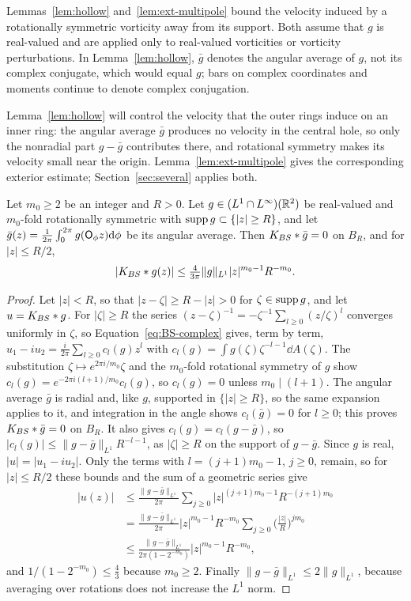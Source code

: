 Lemmas~\ref{lem:hollow} and~\ref{lem:ext-multipole} bound the velocity induced by a rotationally symmetric
vorticity away from its support. Both assume that $g$ is real-valued and are
applied only to real-valued vorticities or vorticity perturbations.
In Lemma~\ref{lem:hollow}, $\bar g$ denotes the angular average of $g$, not
its complex conjugate, which would equal $g$; bars on complex coordinates and
moments continue to denote complex conjugation.

Lemma~\ref{lem:hollow} will control the
velocity that the outer rings induce on an inner ring: the angular average
$\bar g$ produces no velocity in the central hole, so only the nonradial
part $g-\bar g$ contributes there, and rotational symmetry makes its
velocity small near the origin. Lemma~\ref{lem:ext-multipole} gives the
corresponding exterior estimate; Section~\ref{sec:several} applies both.

\begin{lemma}
\label{lem:hollow}
Let $m_0\ge2$ be an integer and $R>0$. Let $g\in (L^1\cap L^\infty)(\mathbb{R}^2)$ be
real-valued and $m_0$-fold rotationally symmetric with $\operatorname{supp} g\subset\{|z|\ge R\}$, and let
$\bar g(z)=\frac1{2\pi}\int_0^{2\pi}g(\mathsf{O}_\phi z)\dd\phi$ be its angular
average. Then $K_{BS}\ast\bar g=0$ on $B_R$, and for $|z|\le R/2$,
\[
|K_{BS}\ast g(z)|\le\tfrac4{3\pi}\|g\|_{L^1}|z|^{m_0-1}R^{-m_0}.
\]
\end{lemma}

\begin{proof}
Let $|z|<R$, so that $|z-\zeta|\ge R-|z|>0$ for $\zeta\in\operatorname{supp} g$, and let $u=K_{BS}\ast g$. For $|\zeta|\ge R$ the series
$(z-\zeta)^{-1}=-\zeta^{-1}\sum_{l\ge0}(z/\zeta)^l$ converges uniformly in $\zeta$,
so Equation~\eqref{eq:BS-complex} gives, term by term,
$u_1-iu_2=\frac{i}{2\pi}\sum_{l\ge0}c_l(g)z^l$ with
$c_l(g)=\int g(\zeta)\zeta^{-l-1}\dd A(\zeta)$. The substitution $\zeta\mapsto e^{2\pi i/m_0}\zeta$ and the $m_0$-fold rotational
symmetry of $g$ show $c_l(g)=e^{-2\pi
i(l+1)/m_0}c_l(g)$, so $c_l(g)=0$ unless $m_0\mid(l+1)$. The angular average
$\bar g$ is radial and, like $g$, supported in $\{|z|\ge R\}$, so the same
expansion applies to it, and integration in the angle
shows $c_l(\bar g)=0$ for $l\ge0$; this proves $K_{BS}\ast\bar g=0$ on $B_R$. It
also gives $c_l(g)=c_l(g-\bar g)$, so $|c_l(g)|\le\|g-\bar g\|_{L^1}R^{-l-1}$,
as $|\zeta|\ge R$ on the support of $g-\bar g$.
Since $g$ is real, $|u|=|u_1-iu_2|$. Only the terms with $l=(j+1)m_0-1$, $j\ge0$,
remain, so for $|z|\le R/2$ these bounds and the sum of a geometric series
give
\[
\begin{aligned}
|u(z)|&\le\frac{\|g-\bar g\|_{L^1}}{2\pi}\sum_{j\ge0}|z|^{(j+1)m_0-1}R^{-(j+1)m_0}\\
&=\frac{\|g-\bar g\|_{L^1}}{2\pi}|z|^{m_0-1}R^{-m_0}
\sum_{j\ge0}\Big(\frac{|z|}{R}\Big)^{jm_0}\\
&\le\frac{\|g-\bar g\|_{L^1}}{2\pi(1-2^{-m_0})}|z|^{m_0-1}R^{-m_0},
\end{aligned}
\]
and $1/(1-2^{-m_0})\le\frac43$ because $m_0\ge2$. Finally
$\|g-\bar g\|_{L^1}\le2\|g\|_{L^1}$, because averaging over rotations does
not increase the $L^1$ norm.
\end{proof}

